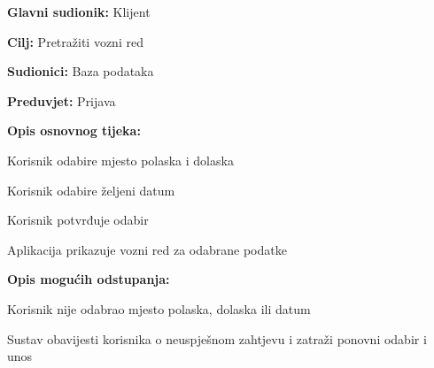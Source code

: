 					\noindent {}
					\begin{packed_item}
	
						\item \textbf{Glavni sudionik: } Klijent
						\item  \textbf{Cilj:} Pretražiti vozni red
						\item  \textbf{Sudionici:} Baza podataka
						\item  \textbf{Preduvjet:} Prijava
						\item  \textbf{Opis osnovnog tijeka:}
						
						\item[] \begin{packed_enum}
	
							\item Korisnik odabire mjesto polaska i dolaska
							\item Korisnik odabire željeni datum
							\item Korisnik potvrđuje odabir
							\item Aplikacija prikazuje vozni red za odabrane podatke
							
						\end{packed_enum}
						
						\item  \textbf{Opis mogućih odstupanja:}
						
						\item[] \begin{packed_item}
	
							\item[3.a] Korisnik nije odabrao mjesto polaska, dolaska ili datum
							\item[] \begin{packed_enum}
								
								\item Sustav obavijesti korisnika o neuspješnom zahtjevu i zatraži ponovni odabir i unos
								
							\end{packed_enum}
							
						\end{packed_item}
					\end{packed_item}
					
